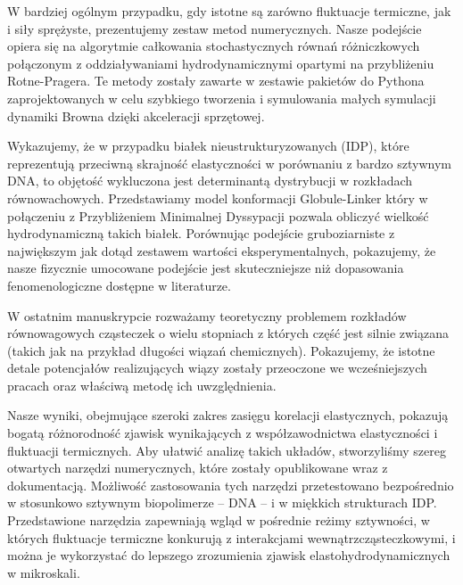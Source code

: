 W bardziej ogólnym przypadku, gdy istotne są zarówno fluktuacje termiczne, jak i siły sprężyste, prezentujemy zestaw metod numerycznych.
Nasze podejście opiera się na algorytmie całkowania stochastycznych równań różniczkowych połączonym z oddziaływaniami hydrodynamicznymi opartymi na przybliżeniu Rotne-Pragera.
Te metody zostały zawarte w zestawie pakietów do Pythona zaprojektowanych w celu szybkiego tworzenia i symulowania małych symulacji dynamiki Browna dzięki akceleracji sprzętowej.

Wykazujemy, że w przypadku białek nieustrukturyzowanych (IDP), które reprezentują przeciwną skrajność elastyczności w porównaniu z bardzo sztywnym DNA, to objętość wykluczona jest determinantą dystrybucji w rozkładach równowachowych.
Przedstawiamy model konformacji Globule-Linker który w połączeniu z Przybliżeniem Minimalnej Dyssypacji pozwala obliczyć wielkość hydrodynamiczną takich białek.
Porównując podejście gruboziarniste z największym jak dotąd zestawem wartości eksperymentalnych, pokazujemy, że nasze fizycznie umocowane podejście jest skuteczniejsze niż dopasowania fenomenologiczne dostępne w literaturze.

W ostatnim manuskrypcie rozważamy teoretyczny problemem rozkładów równowagowych cząsteczek o wielu stopniach z których część jest silnie związana (takich jak na przykład długości wiązań chemicznych).
Pokazujemy, że istotne detale potencjałów realizujących wiązy zostały przeoczone we wcześniejszych pracach oraz właściwą metodę ich uwzględnienia.

Nasze wyniki, obejmujące szeroki zakres zasięgu korelacji elastycznych, pokazują bogatą różnorodność zjawisk wynikających z współzawodnictwa elastyczności i fluktuacji termicznych.
Aby ułatwić analizę takich układów, stworzyliśmy szereg otwartych narzędzi numerycznych, które zostały opublikowane wraz z dokumentacją.
Możliwość zastosowania tych narzędzi przetestowano bezpośrednio w stosunkowo sztywnym biopolimerze -- DNA -- i w miękkich strukturach IDP.
Przedstawione narzędzia zapewniają wgląd w pośrednie reżimy sztywności, w których fluktuacje termiczne konkurują z interakcjami wewnątrzcząsteczkowymi, i można je wykorzystać do lepszego zrozumienia zjawisk elastohydrodynamicznych w mikroskali.
